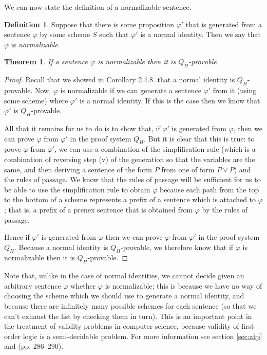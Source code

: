 \documentclass[a4paper,12pt]{report}
\newtheorem{theo}{Theorem}
\theoremstyle{definition}
\newtheorem{mydef}[lem]{Definition}
\begin{document}
We can now state the definition of a normalizable sentence.

\begin{mydef}
Suppose that there is some proposition $\varphi'$ that is generated from a sentence $\varphi$ by some scheme $S$ such that $\varphi'$ is a normal identity. Then we say that $\varphi$ is \emph{normalizable}.
\end{mydef}

\begin{theo}
\label{A theorem}
If a sentence $\varphi$ is normalizable then it is $Q_H$-provable.
\end{theo}
\begin{proof}
Recall that we showed in Corollary 2.4.8. that a normal identity is $Q_H$-provable. Now, $\varphi$ is normalizable if we can generate a sentence $\varphi'$ from it (using some scheme) where $\varphi'$ is a normal identity. If this is the case then we know that $\varphi'$ is $Q_H$-provable. 

All that it remains for us to do is to show that, if $\varphi'$ is generated from $\varphi$, then we can prove $\varphi$ from $\varphi'$ in the proof system $Q_H$. But it is clear that this is true: to prove $\varphi$ from $\varphi'$, we can use a combination of the simplification rule (which is a combination of reversing step (v) of the generation so that the variables are the same, and then deriving a sentence of the form $P$ from  one of form $P \lor P$) and the rules of passage. We know that the rules of passage will be sufficient for us to be able to use the simplification rule to obtain $\varphi$ because each path from the top to the bottom of a scheme represents a prefix of a sentence which is attached to $\varphi$; that is, a prefix of a prenex sentence that is obtained from $\varphi$ by the rules of passage.

Hence if $\varphi'$ is generated from $\varphi$ then we can prove $\varphi$ from $\varphi'$ in the proof system $Q_H$. Because a normal identity is $Q_H$-provable, we therefore know that if $\varphi$ is normalizable then it is $Q_H$-provable.
\end{proof}

Note that, unlike in the case of normal identities, we cannot decide given an arbitrary sentence $\varphi$ whether $\varphi$ is normalizable; this is because we have no way of choosing the scheme which we should use to generate a normal identity, and because there are infinitely many possible schemes for each sentence (so that we can't exhaust the list by checking them in turn). This is an important point in the treatment of validity problems in computer science, because validity of first order logic is a semi-decidable problem. For more information see section \ref{sec:atp} and \cite{ai} (pp. 286--290).
\end{document}
